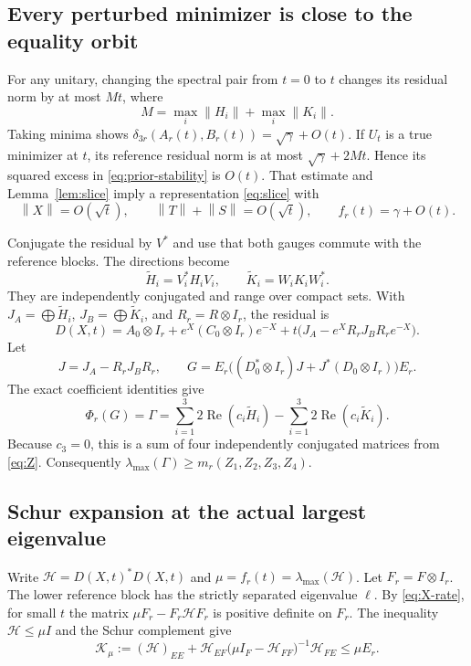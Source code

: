 \documentclass[11pt]{article}
\theoremstyle{remark}\newtheorem{remark}[theorem]{Remark}
\newcommand{\Ree}{\operatorname{Re}}
\newcommand{\dd}{\delta}
\newcommand{\norm}[1]{\left\lVert#1\right\rVert}
\begin{document}
\subsection{Every perturbed minimizer is close to the equality orbit}
For any unitary, changing the spectral pair from $t=0$ to $t$ changes its residual norm by at most $Mt$, where
\[
 M=\max_i\norm{H_i}+\max_i\norm{K_i}.
\]
Taking minima shows $\dd_{3r}(A_r(t),B_r(t))=\sqrt\gamma+O(t)$. If $U_t$ is a true minimizer at $t$, its reference residual norm is at most $\sqrt\gamma+2Mt$. Hence its squared excess in \eqref{eq:prior-stability} is $O(t)$. That estimate and Lemma~\ref{lem:slice} imply a representation \eqref{eq:slice} with
\begin{equation}\label{eq:X-rate}
 \norm X=O(\sqrt t),\qquad \norm T+\norm S=O(\sqrt t),\qquad f_r(t)=\gamma+O(t).
\end{equation}

Conjugate the residual by $V^*$ and use that both gauges commute with the reference blocks. The directions become
\[
 \widetilde H_i=V_i^*H_iV_i,\qquad \widetilde K_i=W_iK_iW_i^*.
\]
They are independently conjugated and range over compact sets. With $J_A=\bigoplus\widetilde H_i$, $J_B=\bigoplus\widetilde K_i$, and $R_r=R\otimes I_r$, the residual is
\begin{equation}\label{eq:residual}
 D(X,t)=A_0\otimes I_r+e^X(C_0\otimes I_r)e^{-X}
       +t\bigl(J_A-e^X R_rJ_BR_re^{-X}\bigr).
\end{equation}
Let
\[
 J=J_A-R_rJ_BR_r,\qquad
 G=E_r\bigl((D_0^*\otimes I_r)J+J^*(D_0\otimes I_r)\bigr)E_r.
\]
The exact coefficient identities give
\begin{equation}\label{eq:Gamma}
 \Phi_r(G)=\Gamma
 =\sum_{i=1}^3 2\Ree(c_i\widetilde H_i)
  -\sum_{i=1}^3 2\Ree(c_i\widetilde K_i).
\end{equation}
Because $c_3=0$, this is a sum of four independently conjugated matrices from \eqref{eq:Z}. Consequently $\lambda_{\max}(\Gamma)\ge m_r(Z_1,Z_2,Z_3,Z_4)$.

\subsection{Schur expansion at the actual largest eigenvalue}
Write $\mathcal H=D(X,t)^*D(X,t)$ and $\mu=f_r(t)=\lambda_{\max}(\mathcal H)$. Let $F_r=F\otimes I_r$. The lower reference block has the strictly separated eigenvalue $\ell$. By \eqref{eq:X-rate}, for small $t$ the matrix $\mu F_r-F_r\mathcal H F_r$ is positive definite on $F_r$. The inequality $\mathcal H\le\mu I$ and the Schur complement give
\begin{equation}\label{eq:Schur}
 \mathcal K_\mu:=(\mathcal H)_{EE}
 +\mathcal H_{EF}\bigl(\mu I_F-\mathcal H_{FF}\bigr)^{-1}\mathcal H_{FE}
 \le\mu E_r.
\end{equation}
\end{document}
